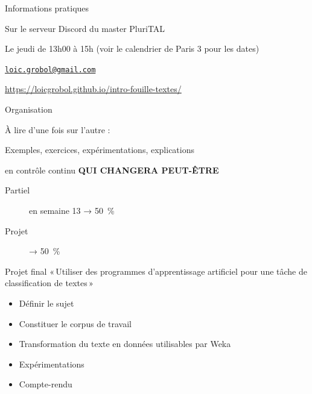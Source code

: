 \documentclass[xcolor={svgnames}, french]{beamer}
\title{\titlepagetitle}
\subtitle{\titlepagesubtitle}
\author{\textbf{\myname} (\mylab)}
\institute{}
\date{\tiny Version {\yyyymmdddate\today}T\currenttime}
\begin{document}

\begin{frame}[plain]
	\titlepage %
\end{frame}

\lecture{\titlepagesubtitle}{\docdate}
\begin{frame}{Informations pratiques}
	\begin{description}[*]
		\item[Où] Sur le serveur Discord du master PluriTAL
		\item[Quand] Le jeudi de 13h00 à 15h (voir le calendrier de Paris 3 pour les dates)
		\item[Email] \href{mailto:loic.grobol@gmail.com}{\texttt{loic.grobol@gmail.com}}
		\item[Web] \url{https://loicgrobol.github.io/intro-fouille-textes/}
	\end{description}
\end{frame}

\begin{frame}{Organisation}
	\begin{description}[*]
		\item[Poly] À lire d'une fois sur l'autre :\\
			{\footnotesize{}}
		\item[Cours] Exemples, exercices, expérimentations, explications
		\item[Évaluation] en contrôle continu \textbf{QUI CHANGERA PEUT-ÊTRE}
			\begin{description}
				\item[Partiel] en semaine 13 → \SI{50}{\percent}
				\item[Projet] → \SI{50}{\percent}
			\end{description}
	\end{description}
\end{frame}

\begin{frame}{Projet final}
	« Utiliser des programmes d'apprentissage artificiel pour une tâche de classification de textes »
	\begin{itemize}
		\item Définir le sujet
		\item Constituer le corpus de travail
		\item Transformation du texte en données utilisables par Weka
		\item Expérimentations
		\item Compte-rendu
	\end{itemize}
\end{frame}
\end{document}

